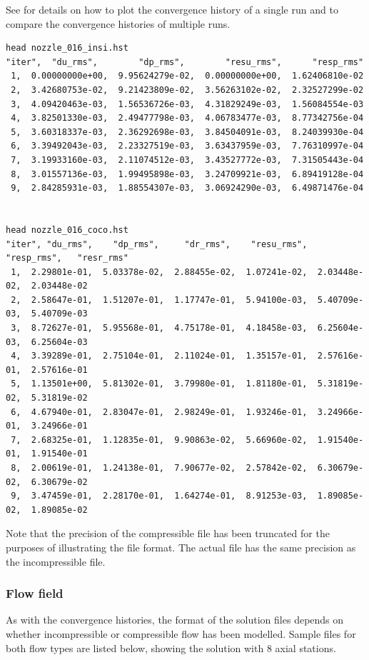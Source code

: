 See  for details on how to plot the convergence history of a single run and
to compare the convergence histories of multiple runs.

\begin{verbatim}
head nozzle_016_insi.hst
"iter",  "du_rms",        "dp_rms",        "resu_rms",      "resp_rms"
 1,  0.00000000e+00,  9.95624279e-02,  0.00000000e+00,  1.62406810e-02
 2,  3.42680753e-02,  9.21423809e-02,  3.56263102e-02,  2.32527299e-02
 3,  4.09420463e-03,  1.56536726e-03,  4.31829249e-03,  1.56084554e-03
 4,  3.82501330e-03,  2.49477798e-03,  4.06783477e-03,  8.77342756e-04
 5,  3.60318337e-03,  2.36292698e-03,  3.84504091e-03,  8.24039930e-04
 6,  3.39492043e-03,  2.23327519e-03,  3.63437959e-03,  7.76310997e-04
 7,  3.19933160e-03,  2.11074512e-03,  3.43527772e-03,  7.31505443e-04
 8,  3.01557136e-03,  1.99495898e-03,  3.24709921e-03,  6.89419128e-04
 9,  2.84285931e-03,  1.88554307e-03,  3.06924290e-03,  6.49871476e-04


head nozzle_016_coco.hst
"iter", "du_rms",    "dp_rms",     "dr_rms",    "resu_rms",   "resp_rms",   "resr_rms"
 1,  2.29801e-01,  5.03378e-02,  2.88455e-02,  1.07241e-02,  2.03448e-02,  2.03448e-02
 2,  2.58647e-01,  1.51207e-01,  1.17747e-01,  5.94100e-03,  5.40709e-03,  5.40709e-03
 3,  8.72627e-01,  5.95568e-01,  4.75178e-01,  4.18458e-03,  6.25604e-03,  6.25604e-03
 4,  3.39289e-01,  2.75104e-01,  2.11024e-01,  1.35157e-01,  2.57616e-01,  2.57616e-01
 5,  1.13501e+00,  5.81302e-01,  3.79980e-01,  1.81180e-01,  5.31819e-02,  5.31819e-02
 6,  4.67940e-01,  2.83047e-01,  2.98249e-01,  1.93246e-01,  3.24966e-01,  3.24966e-01
 7,  2.68325e-01,  1.12835e-01,  9.90863e-02,  5.66960e-02,  1.91540e-01,  1.91540e-01
 8,  2.00619e-01,  1.24138e-01,  7.90677e-02,  2.57842e-02,  6.30679e-02,  6.30679e-02
 9,  3.47459e-01,  2.28170e-01,  1.64274e-01,  8.91253e-03,  1.89085e-02,  1.89085e-02
\end{verbatim}

Note that the precision of the compressible file has been truncated for the purposes of 
illustrating the file format. The actual file has the same precision as the incompressible file.


\subsubsection{Flow field}
\label{subsubsec-form-flow}

As with the convergence histories, the format of the solution files depends on whether
incompressible or compressible flow has been modelled.
Sample files for both flow types are listed below, showing the solution with 8 axial
stations.

